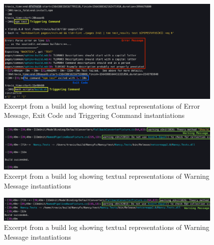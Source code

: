 \documentclass[\myrootdir/main.tex]{subfiles}
\begin{document}
\begin{figure}[h]
	\centering
	\includegraphics[width=\textwidth, clip]{img/log3.png}
	\caption{Excerpt from a build log showing textual representations of Error Message, Exit Code and Triggering Command instantiations}
	\label{fig:log-3}
\end{figure}
\begin{figure}[h]
	\centering
	\includegraphics[width=\textwidth, clip]{img/log4.png}
	\caption{Excerpt from a build log showing textual representations of Warning Message instantiations}
	\label{fig:log-4}
\end{figure}
\begin{figure}[h]
	\centering
	\includegraphics[width=\textwidth, clip]{img/log5.png}
	\caption{Excerpt from a build log showing textual representations of Warning Message instantiations}
	\label{fig:log-5}
\end{figure}
\end{document}
